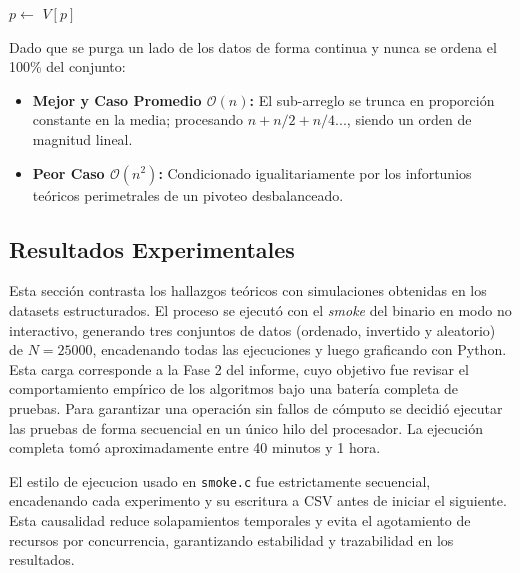 \begin{algorithm}[H]
    \caption{Quick Select $\triangleright$ Búsqueda indexada selectiva}
    \begin{algorithmic}[1]
        \State $p \gets$ 
            \Return $V[p]$
            \Return {}
        \Else
            \Return {}
        \EndIf
        \EndProcedure
    \end{algorithmic}
\end{algorithm}

Dado que se purga un lado de los datos de forma continua y nunca se ordena el 100\% del conjunto:
\begin{itemize}
    \item \textbf{Mejor y Caso Promedio $\mathcal{O}(n)$:} El sub-arreglo se trunca en proporción constante en la media; procesando $n + n/2 + n/4...$, siendo un orden de magnitud lineal.
    \item \textbf{Peor Caso $\mathcal{O}(n^2)$:} Condicionado igualitariamente por los infortunios teóricos perimetrales de un pivoteo desbalanceado.
\end{itemize}


\subsection{Resultados Experimentales}\label{sec:resultados_experimentales}
Esta sección contrasta los hallazgos teóricos con simulaciones obtenidas en los datasets estructurados. El proceso se ejecutó con el \textit{smoke} del binario en modo no interactivo, generando tres conjuntos de datos (ordenado, invertido y aleatorio) de $N=25000$, encadenando todas las ejecuciones y luego graficando con Python. Esta carga corresponde a la Fase 2 del informe, cuyo objetivo fue revisar el comportamiento empírico de los algoritmos bajo una batería completa de pruebas. Para garantizar una operación sin fallos de cómputo se decidió ejecutar las pruebas de forma secuencial en un único hilo del procesador. La ejecución completa tomó aproximadamente entre 40 minutos y 1 hora.

El estilo de ejecucion usado en \texttt{smoke.c} fue estrictamente secuencial, encadenando cada experimento y su escritura a CSV antes de iniciar el siguiente. Esta causalidad reduce solapamientos temporales y evita el agotamiento de recursos por concurrencia, garantizando estabilidad y trazabilidad en los resultados.

